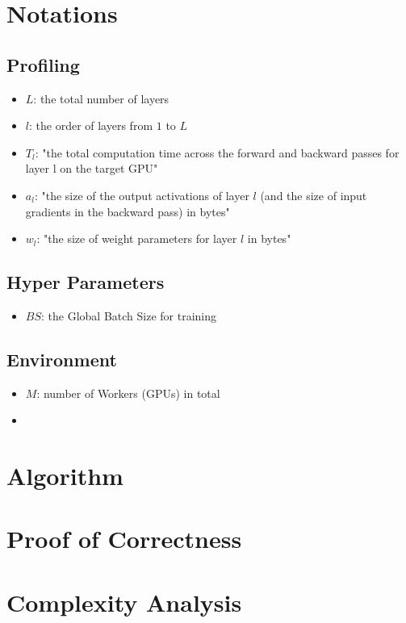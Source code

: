 \documentclass[12pt,letterpaper]{article}
\begin{document}
\section {Notations}
\subsection {Profiling}
\begin{itemize}
	\item $L$: the total number of layers
	\item $l$: the order of layers from $1$ to $L$
	\item $T_l$: "the total computation time across the forward and backward passes for layer l on the target GPU"
	\item $a_l$: "the size of the output activations of layer $l$ (and the size of input gradients in the backward pass) in bytes"
	\item $w_l$: "the size of weight parameters for layer $l$ in bytes"
\end{itemize}
\subsection {Hyper Parameters}
\begin{itemize}
	\item $BS$: the Global Batch Size for training
\end{itemize}
\subsection {Environment}
\begin{itemize}
	\item $M$: number of Workers (GPUs) in total
	\item 
\end{itemize}

\section* {Algorithm}

\section* {Proof of Correctness}

\section* {Complexity Analysis}
\end{document}
